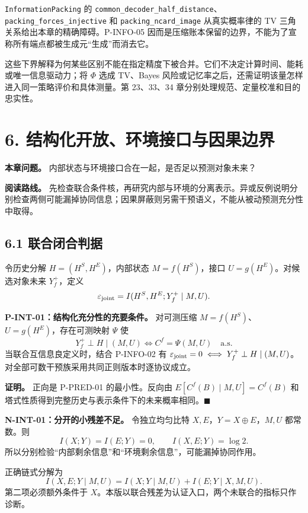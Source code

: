 \documentclass[
  11pt,
  oneside]{book}
\begin{document}
\nolinkurl{InformationPacking} 的 \nolinkurl{common_decoder_half_distance}、\nolinkurl{packing_forces_injective} 和 \nolinkurl{packing_ncard_image} 从真实概率律的 TV 三角关系给出本章的精确障碍。P-INFO-05 因而是压缩账本保留的边界，不能为了宣称所有端点都被生成元``生成''而消去它。

这些下界解释为何某些区别不能在指定精度下被合并。它们不决定计算时间、能耗或唯一信息驱动力；将 \(\Phi\) 选成 TV、Bayes 风险或记忆率之后，还需证明该量怎样进入同一策略评价和具体测量。第 23、33、34 章分别处理规范、定量校准和目的忠实性。

\chapter{6. 结构化开放、环境接口与因果边界}\label{ch-6}

\textbf{本章问题。} 内部状态与环境接口合在一起，是否足以预测对象未来？

\textbf{阅读路线。} 先检查联合条件核，再研究内部与环境的分离表示。异或反例说明分别检查两侧可能漏掉协同信息；因果屏蔽则另需干预语义，不能从被动预测充分性中取得。

\section{6.1 联合闭合判据}\label{ux8054ux5408ux95edux5408ux5224ux636e}

令历史分解 \(H=(H^S,H^E)\)，内部状态 \(M=f(H^S)\)，接口 \(U=g(H^E)\)。对候选对象未来 \(Y_f^+\)，定义 \[\varepsilon_{\rm joint}
=I(H^S,H^E;Y_f^+\mid M,U).\]

\hypertarget{p-int-01}{}\label{p-int-01}

\textbf{P-INT-01：结构化充分性的充要条件。} 对可测压缩 \(M=f(H^S)\)、\(U=g(H^E)\)，存在可测映射 \(\Psi\) 使 \[Y_f^+\perp H\mid(M,U)
\iff C^f=\Psi(M,U)\quad\text{a.s.}\] 当联合互信息良定义时，结合 P-INFO-02 有 \(\varepsilon_{\rm joint}=0\iff Y_f^+\perp H\mid(M,U)\)。对全部可数干预族采用共同正则版本时逐协议成立。

\textbf{证明。} 正向是 P-PRED-01 的最小性。反向由 \(E[C^f(B)\mid M,U]=C^f(B)\) 和塔式性质得到完整历史与表示条件下的未来概率相同。\(\blacksquare\)

\textbf{N-INT-01：分开的小残差不足。} 令独立均匀比特 \(X,E\)，\(Y=X\oplus E\)，\(M,U\) 都常数。则 \[I(X;Y)=I(E;Y)=0,\qquad I(X,E;Y)=\log2.\] 所以分别检验``内部剩余信息''和``环境剩余信息''，可能漏掉协同作用。

正确链式分解为 \[I(X,E;Y\mid M,U)
=I(X;Y\mid M,U)+I(E;Y\mid X,M,U).\] 第二项必须额外条件于 \(X\)。本版以联合残差为认证入口，两个未联合的指标只作诊断。
\end{document}
